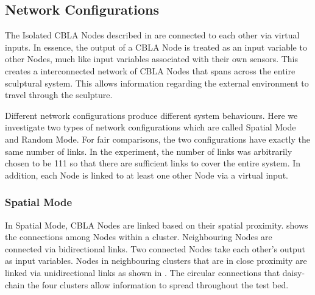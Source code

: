 \subsection{Network Configurations}

The Isolated CBLA Nodes described in  are connected to each other via virtual inputs. In essence, the output of a CBLA Node is treated as an input variable to other Nodes, much like input variables associated with their own sensors. This creates a interconnected network of CBLA Nodes that spans across the entire sculptural system. This allows information regarding the external environment to travel through the sculpture. 

Different network configurations produce different system behaviours. Here we investigate two types of network configurations which are called Spatial Mode and Random Mode. For fair comparisons, the two configurations have exactly the same number of links. In the experiment, the number of links was arbitrarily chosen to be 111 so that there are sufficient links to cover the entire system. In addition, each Node is linked to at least one other Node via a virtual input. 

\subsubsection{Spatial Mode}

In Spatial Mode, CBLA Nodes are linked based on their spatial proximity.  shows the connections among Nodes within a cluster. Neighbouring Nodes are connected via bidirectional links. Two connected Nodes take each other's output as input variables. Nodes in neighbouring clusters that are in close proximity are linked via unidirectional links as shown in . The circular connections that daisy-chain the four clusters allow information to spread throughout the test bed. 

